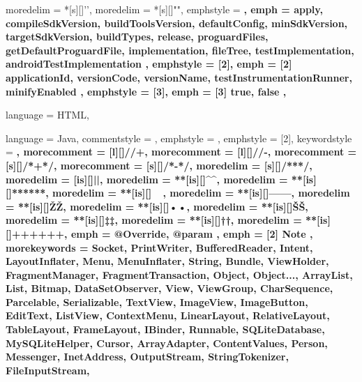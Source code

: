  {
	moredelim = *[s][\color{gray}]{'}{'},
	moredelim = *[s][\color{ForestGreen}]{"}{"},
	emphstyle = \bfseries,
	emph = {
		apply,
		compileSdkVersion,
		buildToolsVersion,
		defaultConfig,
		minSdkVersion,
		targetSdkVersion,
		buildTypes,
		release,
		proguardFiles,
		getDefaultProguardFile,
		implementation,
		fileTree, testImplementation,
		androidTestImplementation
	},
	emphstyle = {[2]\bfseries\color{violet}},
	emph = {[2]
		applicationId,
		versionCode,
		versionName,
		testInstrumentationRunner,
		minifyEnabled
	},
	emphstyle = {[3]\bfseries\color{orange}},
	emph = {[3]
		true,
		false
	},
}

 {
	language = HTML,
}

 {
	language = Java,
	commentstyle = \color{ashgrey},
	emphstyle = {\color{darkgray}},
	emphstyle = {[2]\bfseries},
	keywordstyle = \color{black}\bfseries,
	morecomment = [l][\color{blue}]{//+},		%
	morecomment = [l][\color{red}]{//-},		%
	morecomment = [s][\color{blue}]{/*+}{*/},	%
	morecomment = [s][\color{red}]{/*-}{*/},	%
	moredelim = [s][\color{ashgrey}]{/**}{*/},		%
	moredelim = [is][\soutthick]{|}{|},						%
	moredelim = **[is][\color{blue}]{^}{^},					%
	moredelim = **[is][\color{ForestGreen}]{***}{***},		%
	moredelim = **[is][\color{red}]{~}{~},					%
	moredelim = **[is][\btHL]{---}{---},					%
	moredelim = **[is][{\btHL[fill=blue!60]}]{Ž}{Ž},		%
	moredelim = **[is][{\btHL[fill=SkyBlue]}]{•}{•},		%
	moredelim = **[is][{\btHL[fill=orange!60]}]{Š}{Š},		%
	moredelim = **[is][{\btHL[fill=yellow!60]}]{‡}{‡},		%
	moredelim = **[is][{\btHL[fill=ForestGreen]}]{†}{†},	%
	moredelim = **[is][{\btHL[fill=green!30]}]{+++}{+++},	%
	emph = {
		@Override,
		@param
	},
	emph = {[2]
		Note
	},
	morekeywords = {
		Socket, PrintWriter, BufferedReader,
		Intent, LayoutInflater, Menu, MenuInflater, String, Bundle, ViewHolder,
		FragmentManager, FragmentTransaction,
		Object, Object...,
		ArrayList, List, Bitmap, DataSetObserver,
		View, ViewGroup,
		CharSequence, Parcelable, Serializable,
		TextView, ImageView,
		ImageButton, EditText, ListView, ContextMenu,
		LinearLayout, RelativeLayout, TableLayout, FrameLayout,
		IBinder, Runnable,
		SQLiteDatabase, MySQLiteHelper, Cursor, ArrayAdapter, ContentValues,
		Person, Messenger,
		InetAddress, OutputStream, StringTokenizer, FileInputStream,
	}
}

